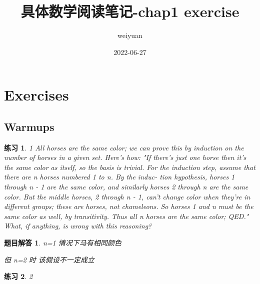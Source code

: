 \documentclass[mode=geye]{elegantnote}
\title{具体数学阅读笔记-chap1 exercise}
\author{weiyuan}
\date{2022-06-27}
\newtheorem{exercise}{练习}
\newtheorem{answer}{题目解答}
\begin{document}
\maketitle

\section{Exercises}
\subsection{Warmups}

\begin{exercise}1
	All horses are the same color; we can prove this by induction on the
	number of horses in a given set. Here's how: "If there's just one horse
	then it's the same color as itself, so the basis is trivial. For the induction
	step, assume that there are n horses numbered 1 to n. By the induc-
	tion hypothesis, horses 1 through n - 1 are the same color, and similarly
	horses 2 through n are the same color. But the middle horses, 2 through
	n - 1, can't change color when they're in different groups; these are
	horses, not chameleons. So horses 1 and n must be the same color as
	well, by transitivity. Thus all n horses are the same color; QED." What,
	if anything, is wrong with this reasoning?
\end{exercise}

\begin{answer}
	n=1 情况下马有相同颜色
	
	但 n=2 时	该假设不一定成立
\end{answer}


\begin{exercise}2
\end{exercise}
\end{document}
